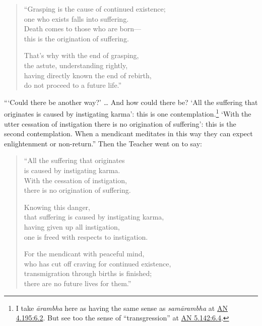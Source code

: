 \documentclass[12pt,openany]{book}%
\begin{document}
\begin{verse}%
“Grasping is the cause of continued existence; \\
one who exists falls into suffering. \\
Death comes to those who are born—\\
this is the origination of suffering. 

That’s why with the end of grasping, \\
the astute, understanding rightly, \\
having directly known the end of rebirth, \\
do not proceed to a future life.” 

%
\end{verse}

“‘Could there be another way?’ … And how could there be? ‘All the suffering that originates is caused by instigating karma’: this is one contemplation.\footnote{I take \textit{\textsanskrit{ārambha}} here as having the same sense as \textit{\textsanskrit{samārambha}} at \href{https://suttacentral.net/an4.195/en/sujato\#6.2}{AN 4.195:6.2}. But see too the sense of “transgression” at \href{https://suttacentral.net/an5.142/en/sujato\#6.4}{AN 5.142:6.4}. } ‘With the utter cessation of instigation there is no origination of suffering’: this is the second contemplation. When a mendicant meditates in this way they can expect enlightenment or non-return.” Then the Teacher went on to say: 

\begin{verse}%
“All the suffering that originates \\
is caused by instigating karma. \\
With the cessation of instigation, \\
there is no origination of suffering. 

Knowing this danger, \\
that suffering is caused by instigating karma, \\
having given up all instigation, \\
one is freed with respects to instigation. 

For the mendicant with peaceful mind, \\
who has cut off craving for continued existence, \\
transmigration through births is finished; \\
there are no future lives for them.” 

%
\end{verse}
\end{document}
